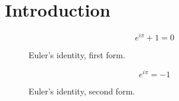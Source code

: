 \documentclass[12pt,]{article}
\begin{document}
  \listoffigures
     \section{Introduction}

    \begin{figure}
	\ContinuedFloat*
	\[ e^{i \pi} + 1 = 0 \]
	\caption{Euler's identity, first form.}
\end{figure}
    \begin{figure}
	\ContinuedFloat
	\[ e^{i \pi} = -1 \]
	\caption{Euler's identity, second form.}
\end{figure}
\end{document}
